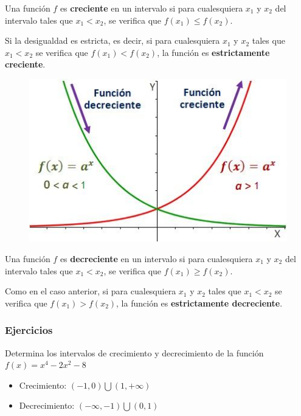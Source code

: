 \begin{definition}
	Una función $f$ es \textbf{creciente} en un intervalo si para cualesquiera $x_1$ y $x_2$ del intervalo tales que $x_{1} < x_{2}$, se verifica que $f(x_{1}) \leq f(x_{2})$.
\end{definition}
Si la desigualdad es estricta, es decir, si para cualesquiera $x_1$ y $x_2$ tales que $x_1 < x_2$ se verifica que $f(x_{1}) < f(x_{2})$, la función es \textbf{estrictamente creciente}.\\
\newline
\begin{figure}
	\includegraphics{samples/propiedades/crecienteDecreciente.jpg}\\
	\centering
\end{figure}

\begin{definition}
	Una función $f$ es \textbf{decreciente} en un intervalo si para cualesquiera $x_1$ y $x_2$ del intervalo tales que $x_{1} < x_{2}$, se verifica que $f(x_{1}) \geq f(x_{2})$.	
\end{definition}
Como en el caso anterior, si para cualesquiera $x_1$ y $x_2$ tales que $x_{1} < x_{2}$ se verifica que $f(x_{1}) > f(x_{2})$, la función es \textbf{estrictamente decreciente}.\\
\subsubsection{Ejercicios}

\begin{ex}
	Determina los intervalos de crecimiento y decrecimiento de la función $f(x)=x^4-2x^2-8$
	\begin{sol}
		\begin{itemize}
			\item Crecimiento: $(-1,0) \bigcup (1,+\infty)$
			\item Decrecimiento: $(-\infty, -1) \bigcup (0,1)$
		\end{itemize}
	\end{sol}
\end{ex}

